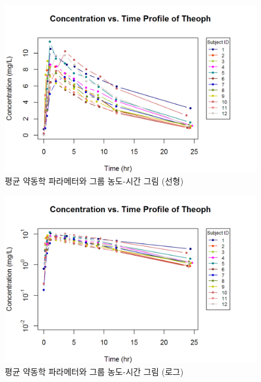\documentclass[12pt,]{krantz}
\theoremstyle{definition}
\theoremstyle{definition}
\theoremstyle{definition}
\theoremstyle{remark}
\begin{document}
\begin{figure}
\centering
\includegraphics{Output/PK_Profile_Linear_Scale_for_Theoph.png}
\caption{\label{fig:unnamed-chunk-19}평균 약동학 파라메터와 그룹 농도-시간
그림 (선형)}
\end{figure}

\begin{figure}
\centering
\includegraphics{Output/PK_Profile_Log_10_Scale_for_Theoph.png}
\caption{\label{fig:unnamed-chunk-20}평균 약동학 파라메터와 그룹 농도-시간
그림 (로그)}
\end{figure}
\end{document}
